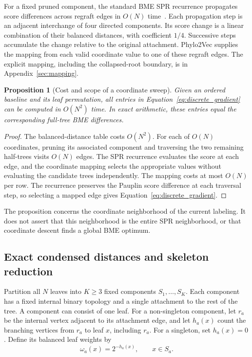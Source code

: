 \documentclass[11pt,a4paper]{article}
\makeatletter
\DeclareRobustCommand{\_}{\ifmmode\nfss@text{\textunderscore}\else\textunderscore\allowbreak\fi}
\newtheorem{proposition}[theorem]{Proposition}
\theoremstyle{definition}
\makeatother
\begin{document}
For a fixed pruned component, the standard BME SPR recurrence propagates score differences across regraft edges in $O(N)$ time~\cite{hordijk2005spr}.
Each propagation step is an adjacent interchange of four directed components.
Its score change is a linear combination of their balanced distances, with coefficient $1/4$.
Successive steps accumulate the change relative to the original attachment.
Phylo2Vec supplies the mapping from each valid coordinate value to one of these regraft edges.
The explicit mapping, including the collapsed-root boundary, is in Appendix~\ref{sec:mapping}.

\begin{proposition}[Cost and scope of a coordinate sweep]
\label{prop:quadratic}
Given an ordered baseline and its leaf permutation, all entries in
Equation~\eqref{eq:discrete_gradient} can be computed in $O(N^2)$ time.
In exact arithmetic, these entries equal the corresponding full-tree BME differences.
\end{proposition}
\begin{proof}
The balanced-distance table costs $O(N^2)$.
For each of $O(N)$ coordinates, pruning its associated component and traversing the two remaining half-trees visits $O(N)$ edges.
The SPR recurrence evaluates the score at each edge, and the coordinate mapping selects the appropriate values without evaluating the candidate trees independently.
The mapping costs at most $O(N)$ per row.
The recurrence preserves the Pauplin score difference at each traversal step, so selecting a mapped edge gives Equation~\eqref{eq:discrete_gradient}.
\end{proof}

The proposition concerns the coordinate neighborhood of the current labeling.
It does not assert that this neighborhood is the entire SPR neighborhood, or that coordinate descent finds a global BME optimum.

\subsection{Exact condensed distances and skeleton reduction}
\label{sec:condensation}

Partition all $N$ leaves into $K\geq3$ fixed components $S_1,\ldots,S_K$.
Each component has a fixed internal binary topology and a single attachment to the rest of the tree.
A component can consist of one leaf.
For a non-singleton component, let $r_a$ be the internal vertex adjacent to its attachment edge, and let $h_a(x)$ count the branching vertices from $r_a$ to leaf $x$, including $r_a$.
For a singleton, set $h_a(x)=0$.
Define its balanced leaf weights by
\begin{equation}
 \omega_a(x)=2^{-h_a(x)},\qquad x\in S_a.
 \label{eq:profile}
\end{equation}
\end{document}
